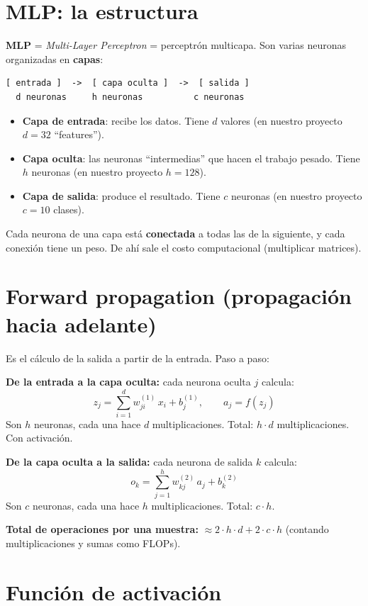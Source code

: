 \documentclass[11pt,a4paper]{article}
\newcommand{\term}[1]{\textbf{\textcolor{clave}{#1}}}
\begin{document}
\section{MLP: la estructura}

\term{MLP} = \emph{Multi-Layer Perceptron} = perceptrón multicapa. Son varias
neuronas organizadas en \textbf{capas}:

\begin{verbatim}
[ entrada ]  ->  [ capa oculta ]  ->  [ salida ]
  d neuronas     h neuronas          c neuronas
\end{verbatim}

\begin{itemize}
  \item \textbf{Capa de entrada}: recibe los datos. Tiene $d$ valores (en nuestro
        proyecto $d=32$ ``features'').
  \item \textbf{Capa oculta}: las neuronas ``intermedias'' que hacen el trabajo
        pesado. Tiene $h$ neuronas (en nuestro proyecto $h=128$).
  \item \textbf{Capa de salida}: produce el resultado. Tiene $c$ neuronas (en
        nuestro proyecto $c=10$ clases).
\end{itemize}

Cada neurona de una capa está \textbf{conectada} a todas las de la siguiente, y
cada conexión tiene un peso. De ahí sale el costo computacional (multiplicar
matrices).

\section{Forward propagation (propagación hacia adelante)}

Es el cálculo de la salida a partir de la entrada. Paso a paso:

\textbf{De la entrada a la capa oculta:} cada neurona oculta $j$ calcula:
\[
z_j = \sum_{i=1}^{d} w_{ji}^{(1)}\, x_i + b_j^{(1)}, \qquad a_j = f(z_j)
\]
Son $h$ neuronas, cada una hace $d$ multiplicaciones. Total: $h\cdot d$
multiplicaciones. Con activación.

\textbf{De la capa oculta a la salida:} cada neurona de salida $k$ calcula:
\[
o_k = \sum_{j=1}^{h} w_{kj}^{(2)}\, a_j + b_k^{(2)}
\]
Son $c$ neuronas, cada una hace $h$ multiplicaciones. Total: $c\cdot h$.

\textbf{Total de operaciones por una muestra:} $\approx 2\cdot h\cdot d + 2\cdot
c\cdot h$ (contando multiplicaciones y sumas como FLOPs).

\section{Función de activación}
\end{document}
